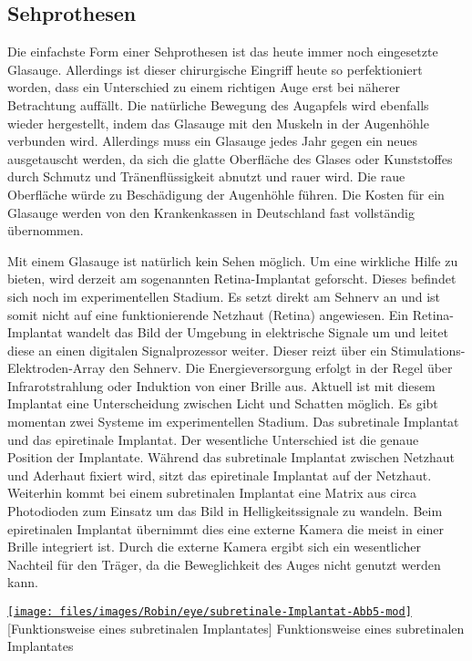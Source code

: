 \subsection{Sehprothesen}
\label{sec:Robin:topical:visual_prosthesis}
Die einfachste Form einer Sehprothesen ist das heute immer noch eingesetzte Glasauge. Allerdings
ist dieser chirurgische Eingriff heute so perfektioniert worden, dass ein Unterschied zu einem
richtigen Auge erst bei näherer Betrachtung auffällt. Die natürliche Bewegung des Augapfels wird
ebenfalls wieder hergestellt, indem das Glasauge mit den Muskeln in der Augenhöhle verbunden wird.
Allerdings muss ein Glasauge jedes Jahr gegen ein neues ausgetauscht werden, da sich die glatte
Oberfläche des Glases oder Kunststoffes durch Schmutz und Tränenflüssigkeit abnutzt und rauer
wird. Die raue Oberfläche würde zu Beschädigung der Augenhöhle führen.
Die Kosten für ein Glasauge werden von den Krankenkassen in Deutschland fast vollständig übernommen.

Mit einem Glasauge ist natürlich kein Sehen möglich. Um eine wirkliche Hilfe zu bieten, wird derzeit
am sogenannten Retina-Implantat geforscht. Dieses befindet sich noch im experimentellen Stadium.
Es setzt direkt am
Sehnerv an und ist somit nicht auf eine funktionierende Netzhaut (Retina) angewiesen. Ein
Retina-Implantat wandelt das Bild der Umgebung in elektrische Signale um und leitet diese an einen
digitalen
Signalprozessor weiter. Dieser reizt über ein Stimulations-Elektroden-Array den Sehnerv. Die
Energieversorgung erfolgt in der Regel über Infrarotstrahlung oder Induktion von einer Brille aus.
Aktuell ist mit diesem Implantat eine Unterscheidung zwischen Licht und Schatten möglich. Es gibt
momentan zwei Systeme im experimentellen Stadium. Das subretinale Implantat und das epiretinale
Implantat. Der wesentliche Unterschied ist die genaue Position der Implantate. Während das
subretinale Implantat zwischen Netzhaut und Aderhaut fixiert wird, sitzt das epiretinale Implantat
auf der Netzhaut. Weiterhin kommt bei einem subretinalen Implantat eine Matrix aus circa
 Photodioden zum Einsatz um das Bild in Helligkeitssignale zu wandeln. Beim
epiretinalen
Implantat übernimmt dies eine externe Kamera die meist in einer Brille integriert ist. Durch die
externe Kamera ergibt sich ein wesentlicher Nachteil für den Träger, da die Beweglichkeit des Auges
nicht genutzt werden kann.

\begin{figurewrapper}
	\href{\URLsubretinaleImplantat}{%
		\texttt{[image: files/images/Robin/eye/subretinale-Implantat-Abb5-mod]}%
	}
	[Funktionsweise eines subretinalen Implantates]%
		{Funktionsweise eines subretinalen Implantates\footnotemark}
	\label{fig:Subretinal_Implant}
\end{figurewrapper}

